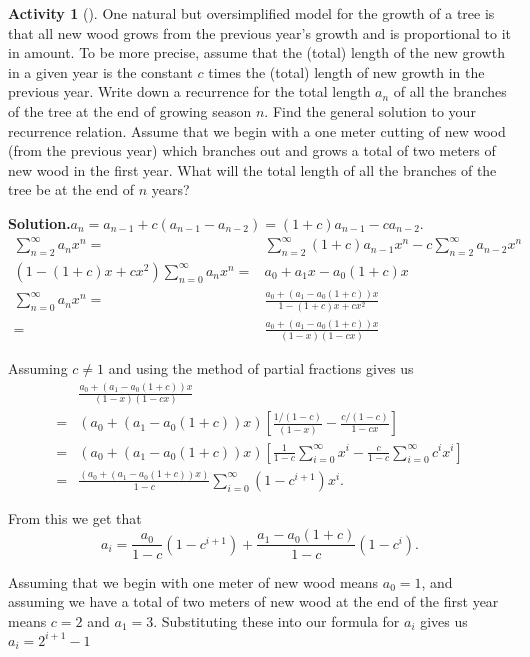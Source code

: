 \documentclass[10pt,]{book}
\theoremstyle{plain}
\theoremstyle{definition}
\newtheorem{activity}[project]{Activity}
\numberwithin{equation}{chapter}
\newcommand{\amp}{&}
\begin{document}
\begin{activity}[]\label{activity-218}
One natural but oversimplified model for the growth of a tree is that all new wood grows from the previous year's growth and is proportional to it in amount. To be more precise, assume that the (total) length of the new growth in a given year is the constant \(c\) times the (total) length of new growth in the previous year. Write down a recurrence for the total length \(a_n\) of all the branches of the tree at the end of growing season \(n\). Find the general solution to your recurrence relation. Assume that we begin with a one meter cutting of new wood (from the previous year) which branches out and grows a total of two meters of new wood in the first year.  What will the total length of all the branches of the tree be at the end of \(n\) years?%
\par\medskip\noindent%
\textbf{Solution.}\quad \(a_n= a_{n-1} +c(a_{n-1}-a_{n-2})=(1+c)a_{n-1}-ca_{n-2}\).%
\begin{align*}
\sum_{n=2}^\infty
a_nx^n =\amp \sum_{n=2}^\infty(1+c)a_{n-1}x^n-c\sum_{n=2}^\infty a_{n-2}x^n\\
(1-(1+c)x +cx^2)\sum_{n=0}^\infty a_nx^n =\amp a_0+a_1x-a_0(1+c)x\\
\sum_{n=0}^\infty a_nx^n  =\amp  \frac{a_0+(a_1-a_0(1+c))x}{1-(1+c)x +cx^2}\\
=\amp  \frac{a_0+(a_1-a_0(1+c))x}{(1-x)(1-cx)}
\end{align*}
%
\par
Assuming \(c\not=1\) and using the method of partial fractions gives us%
\begin{align*}
\amp \frac{a_0+(a_1-a_0(1+c))x}{(1-x)(1-cx)}\\
=\amp  (a_0+(a_1-a_0(1+c))x)
\left[\frac{1/(1-c)}{(1-x)} -\frac{c/(1-c)}{1-cx}\right]\\
=\amp  (a_0+(a_1-a_0(1+c))x)\left[\frac{1}{1-c}\sum_{i=0}^\infty x^i-\frac{c}{1-c}\sum_{i=0}^\infty c^ix^i\right]\\
=\amp  \frac{(a_0+(a_1-a_0(1+c))x)}{1-c}\sum_{i=0}^\infty
(1-c^{i+1})x^i.
\end{align*}
%
\par
From this we get that%
\begin{equation*}
a_i=\frac{a_0}{1-c}(1-c^{i+1}) +\frac{a_1-a_0(1+c)}{1-c}(1-c^i).
\end{equation*}
%
\par
Assuming that we begin with one meter of new wood means \(a_0=1\), and assuming we have a total of two meters of new wood at the end of the first year means \(c=2\) and \(a_1=3\). Substituting these into our formula for \(a_i\) gives us \(a_i=2^{i+1}-1\)%
\end{activity}
\end{document}
